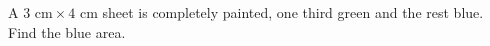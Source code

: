 A $ 3\text{ cm}\times4\text{ cm}$ sheet is completely painted, one third green and the rest blue. Find the blue area.
